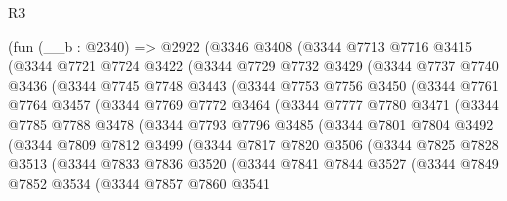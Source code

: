 \begin{lexlean}{R3}
\begin{coremodule}
    (fun (__b : @2340) =>
    @2922
      (@3346
        @3408
        (@3344
          @7713
          @7716
          @3415
          (@3344
            @7721
            @7724
            @3422
            (@3344
              @7729
              @7732
              @3429
              (@3344
                @7737
                @7740
                @3436
                (@3344
                  @7745
                  @7748
                  @3443
                  (@3344
                    @7753
                    @7756
                    @3450
                    (@3344
                      @7761
                      @7764
                      @3457
                      (@3344
                        @7769
                        @7772
                        @3464
                        (@3344
                          @7777
                          @7780
                          @3471
                          (@3344
                            @7785
                            @7788
                            @3478
                            (@3344
                              @7793
                              @7796
                              @3485
                              (@3344
                                @7801
                                @7804
                                @3492
                                (@3344
                                  @7809
                                  @7812
                                  @3499
                                  (@3344
                                    @7817
                                    @7820
                                    @3506
                                    (@3344
                                      @7825
                                      @7828
                                      @3513
                                      (@3344
                                        @7833
                                        @7836
                                        @3520
                                        (@3344
                                          @7841
                                          @7844
                                          @3527
                                          (@3344
                                            @7849
                                            @7852
                                            @3534
                                            (@3344
                                              @7857
                                              @7860
                                              @3541

\end{coremodule}
\end{lexlean}
